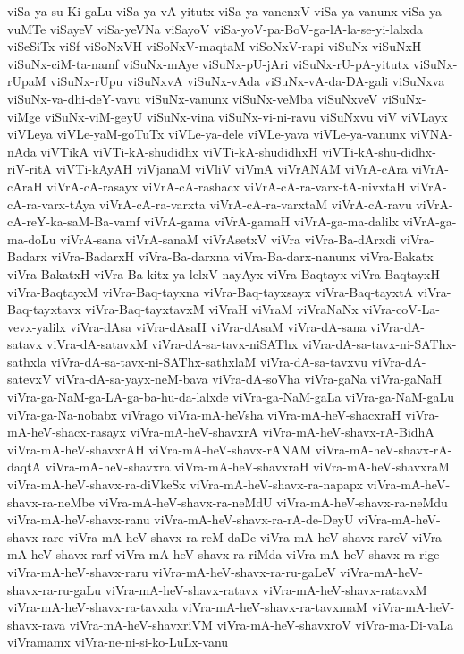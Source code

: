 {viSa-ya-su-Ki-gaLu
viSa-ya-vA-yitutx
viSa-ya-vanenxV
viSa-ya-vanunx
viSa-ya-vuMTe
viSayeV
viSa-yeVNa
viSayoV
viSa-yoV-pa-BoV-ga-lA-la-se-yi-lalxda
viSeSiTx
viSf
viSoNxVH
viSoNxV-maqtaM
viSoNxV-rapi
viSuNx
viSuNxH
viSuNx-ciM-ta-namf
viSuNx-mAye
viSuNx-pU-jAri
viSuNx-rU-pA-yitutx
viSuNx-rUpaM
viSuNx-rUpu
viSuNxvA
viSuNx-vAda
viSuNx-vA-da-DA-gali
viSuNxva
viSuNx-va-dhi-deY-vavu
viSuNx-vanunx
viSuNx-veMba
viSuNxveV
viSuNx-viMge
viSuNx-viM-geyU
viSuNx-vina
viSuNx-vi-ni-ravu
viSuNxvu
viV
viVLayx
viVLeya
viVLe-yaM-goTuTx
viVLe-ya-dele
viVLe-yava
viVLe-ya-vanunx
viVNA-nAda
viVTikA
viVTi-kA-shudidhx
viVTi-kA-shudidhxH
viVTi-kA-shu-didhx-riV-ritA
viVTi-kAyAH
viVjanaM
viVliV
viVmA
viVrANAM
viVrA-cAra
viVrA-cAraH
viVrA-cA-rasayx
viVrA-cA-rashacx
viVrA-cA-ra-varx-tA-nivxtaH
viVrA-cA-ra-varx-tAya
viVrA-cA-ra-varxta
viVrA-cA-ra-varxtaM
viVrA-cA-ravu
viVrA-cA-reY-ka-saM-Ba-vamf
viVrA-gama
viVrA-gamaH
viVrA-ga-ma-dalilx
viVrA-ga-ma-doLu
viVrA-sana
viVrA-sanaM
viVrAsetxV
viVra
viVra-Ba-dArxdi
viVra-Badarx
viVra-BadarxH
viVra-Ba-darxna
viVra-Ba-darx-nanunx
viVra-Bakatx
viVra-BakatxH
viVra-Ba-kitx-ya-lelxV-nayAyx
viVra-Baqtayx
viVra-BaqtayxH
viVra-BaqtayxM
viVra-Baq-tayxna
viVra-Baq-tayxsayx
viVra-Baq-tayxtA
viVra-Baq-tayxtavx
viVra-Baq-tayxtavxM
viVraH
viVraM
viVraNaNx
viVra-coV-La-vevx-yalilx
viVra-dAsa
viVra-dAsaH
viVra-dAsaM
viVra-dA-sana
viVra-dA-satavx
viVra-dA-satavxM
viVra-dA-sa-tavx-niSAThx
viVra-dA-sa-tavx-ni-SAThx-sathxla
viVra-dA-sa-tavx-ni-SAThx-sathxlaM
viVra-dA-sa-tavxvu
viVra-dA-satevxV
viVra-dA-sa-yayx-neM-bava
viVra-dA-soVha
viVra-gaNa
viVra-gaNaH
viVra-ga-NaM-ga-LA-ga-ba-hu-da-lalxde
viVra-ga-NaM-gaLa
viVra-ga-NaM-gaLu
viVra-ga-Na-nobabx
viVrago
viVra-mA-heVsha
viVra-mA-heV-shacxraH
viVra-mA-heV-shacx-rasayx
viVra-mA-heV-shavxrA
viVra-mA-heV-shavx-rA-BidhA
viVra-mA-heV-shavxrAH
viVra-mA-heV-shavx-rANAM
viVra-mA-heV-shavx-rA-daqtA
viVra-mA-heV-shavxra
viVra-mA-heV-shavxraH
viVra-mA-heV-shavxraM
viVra-mA-heV-shavx-ra-diVkeSx
viVra-mA-heV-shavx-ra-napapx
viVra-mA-heV-shavx-ra-neMbe
viVra-mA-heV-shavx-ra-neMdU
viVra-mA-heV-shavx-ra-neMdu
viVra-mA-heV-shavx-ranu
viVra-mA-heV-shavx-ra-rA-de-DeyU
viVra-mA-heV-shavx-rare
viVra-mA-heV-shavx-ra-reM-daDe
viVra-mA-heV-shavx-rareV
viVra-mA-heV-shavx-rarf
viVra-mA-heV-shavx-ra-riMda
viVra-mA-heV-shavx-ra-rige
viVra-mA-heV-shavx-raru
viVra-mA-heV-shavx-ra-ru-gaLeV
viVra-mA-heV-shavx-ra-ru-gaLu
viVra-mA-heV-shavx-ratavx
viVra-mA-heV-shavx-ratavxM
viVra-mA-heV-shavx-ra-tavxda
viVra-mA-heV-shavx-ra-tavxmaM
viVra-mA-heV-shavx-rava
viVra-mA-heV-shavxriVM
viVra-mA-heV-shavxroV
viVra-ma-Di-vaLa
viVramamx
viVra-ne-ni-si-ko-LuLx-vanu
}
